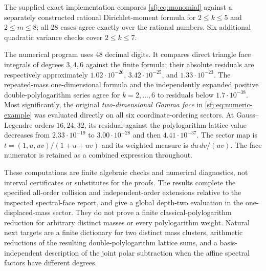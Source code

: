 The supplied exact implementation compares
\eqref{sfj:eq:monomial} against a separately constructed rational
Dirichlet-moment formula for $2\le k\le5$ and $2\le m\le8$;
all 28 cases agree exactly over the rational numbers.  Six additional
quadratic variance checks cover $2\le k\le7$.

The numerical program uses 48 decimal digits.  It compares direct
triangle face integrals of degrees $3,4,6$ against the finite formula;
their absolute residuals are respectively approximately
$1.02\cdot10^{-26}$, $3.42\cdot10^{-25}$, and
$1.33\cdot10^{-23}$.  The repeated-mass one-dimensional formula and
the independently expanded positive double-polylogarithm series agree
for $k=2,\ldots,6$ to residuals below $1.7\cdot10^{-38}$.
Most significantly, the original \emph{two-dimensional Gamma face}
in \eqref{sfj:eq:numeric-example} was evaluated directly on all six
coordinate-ordering sectors.  At Gauss--Legendre orders $16,24,32$,
its residual against the polylogarithm lattice value decreases from
$2.33\cdot10^{-19}$ to $3.00\cdot10^{-28}$ and then
$4.41\cdot10^{-37}$.  The sector map is
$t=(1,u,uv)/(1+u+uv)$ and its weighted measure is $du\,dv/(uv)$.
The face numerator is retained as a combined expression throughout.

These computations are finite algebraic checks and numerical
diagnostics, not interval certificates or substitutes for the proofs.
The results complete the specified all-order collision and
independent-order extensions relative to the inspected spectral-face
report, and give a global depth-two evaluation in the one-displaced-mass
sector.  They do not prove a finite classical-polylogarithm reduction
for arbitrary distinct masses or every polylogarithm weight.  Natural
next targets are a finite dictionary for two distinct mass clusters,
arithmetic reductions of the resulting double-polylogarithm lattice
sums, and a basis-independent description of the joint polar
subtraction when the affine spectral factors have different degrees.
